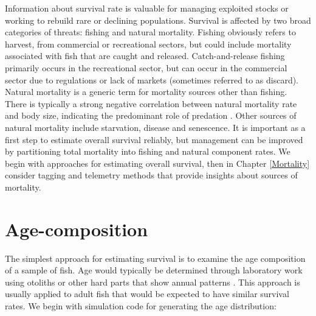\documentclass[
]{krantz}
\begin{document}
Information about survival rate is valuable for managing exploited stocks or working to rebuild rare or declining populations. Survival is affected by two broad categories of threats: fishing and natural mortality. Fishing obviously refers to harvest, from commercial or recreational sectors, but could include mortality associated with fish that are caught and released. Catch-and-release fishing primarily occurs in the recreational sector, but can occur in the commercial sector due to regulations or lack of markets (sometimes referred to as discard). Natural mortality is a generic term for mortality sources other than fishing. There is typically a strong negative correlation between natural mortality rate and body size, indicating the predominant role of predation \citep{lorenzen1996}. Other sources of natural mortality include starvation, disease and senescence. It is important as a first step to estimate overall survival reliably, but management can be improved by partitioning total mortality into fishing and natural component rates. We begin with approaches for estimating overall survival, then in Chapter \ref{Mortality} consider tagging and telemetry methods that provide insights about sources of mortality.

\hypertarget{AgeComp}{%
\section{Age-composition}\label{AgeComp}}

The simplest approach for estimating survival is to examine the age composition of a sample of fish. Age would typically be determined through laboratory work using otoliths or other hard parts that show annual patterns \citep{campana2001}. This approach is usually applied to adult fish that would be expected to have similar survival rates. We begin with simulation code for generating the age distribution:
\end{document}
